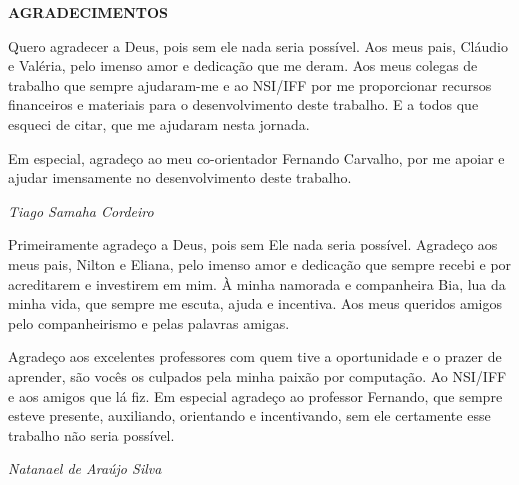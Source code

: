 \begin{center}
\textbf{AGRADECIMENTOS}
\end{center}

Quero agradecer a Deus, pois sem ele nada seria possível. Aos meus pais, Cláudio e Valéria, pelo imenso amor e dedicação que me deram. Aos meus colegas de trabalho que sempre ajudaram-me e ao NSI/IFF por me proporcionar recursos financeiros e materiais para o desenvolvimento deste trabalho. E a todos que esqueci de citar, que me ajudaram nesta jornada.

Em especial, agradeço ao meu co-orientador Fernando Carvalho, por me apoiar e ajudar imensamente no desenvolvimento deste trabalho.

\begin{flushright}
  \textit{Tiago Samaha Cordeiro}
\end{flushright}

Primeiramente agradeço a Deus, pois sem Ele nada seria possível. Agradeço aos meus pais, Nilton e Eliana, pelo imenso amor e dedicação que sempre recebi e por acreditarem e investirem em mim. À minha namorada e companheira Bia, lua da minha vida, que sempre me escuta, ajuda e incentiva. Aos meus queridos amigos pelo companheirismo e pelas palavras amigas.

Agradeço aos excelentes professores com quem tive a oportunidade e o prazer de aprender, são vocês os culpados pela minha paixão por computação. Ao NSI/IFF e aos amigos que lá fiz. Em especial agradeço ao professor Fernando, que sempre esteve presente, auxiliando, orientando e incentivando, sem ele certamente esse trabalho não seria possível.

\begin{flushright}
  \textit{Natanael de Araújo Silva}
\end{flushright}